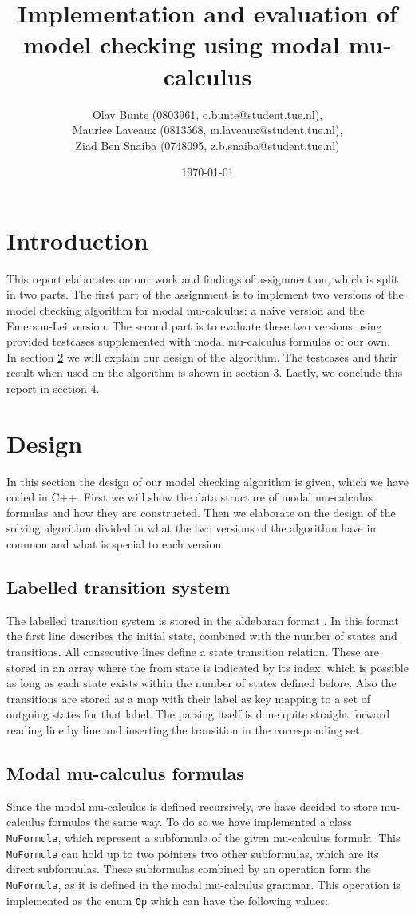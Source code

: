 \documentclass[10pt,a4paper]{article}
\title{Implementation and evaluation of model checking using modal mu-calculus}
\author{Olav Bunte (0803961, o.bunte@student.tue.nl),\\
Maurice Laveaux (0813568, m.laveaux@student.tue.nl),\\
Ziad Ben Snaiba (0748095, z.b.snaiba@student.tue.nl)}
\date{\today}
\begin{document}
\maketitle

\section{Introduction}
This report elaborates on our work and findings of assignment on, which is split in two parts. The first part of the assignment is to implement two versions of the model checking algorithm for modal mu-calculus: a naive version and the Emerson-Lei version. The second part is to evaluate these two versions using provided testcases supplemented with modal mu-calculus formulas of our own.\\
In section \ref{design} we will explain our design of the algorithm. The testcases and their result when used on the algorithm is shown in section 3. Lastly, we conclude this report in section 4.

\section{Design}\label{design}
In this section the design of our model checking algorithm is given, which we have coded in C++. First we will show the data structure of modal mu-calculus formulas and how they are constructed. Then we elaborate on the design of the solving algorithm divided in what the two versions of the algorithm have in common and what is special to each version.

\subsection{Labelled transition system}
The labelled transition system is stored in the aldebaran format \cite{aldebaran}. In this format the first line describes the initial state, combined with the number of states and transitions. All consecutive lines define a state transition relation. These are stored in an array where the from state is indicated by its index, which is possible as long as each state exists within the number of states defined before. Also the transitions are stored as a map with their label as key mapping to a set of outgoing states for that label. The parsing itself is done quite straight forward reading line by line and inserting the transition in the corresponding set.

\subsection{Modal mu-calculus formulas}
Since the modal mu-calculus is defined recursively, we have decided to store mu-calculus formulas the same way. To do so we have implemented a class \texttt{MuFormula}, which represent a subformula of the given mu-calculus formula. This \texttt{MuFormula} can hold up to two pointers two other subformulas, which are its direct subformulas. These subformulas combined by an operation form the \texttt{MuFormula}, as it is defined in the modal mu-calculus grammar. This operation is implemented as the enum \texttt{Op} which can have the following values:
\end{document}
